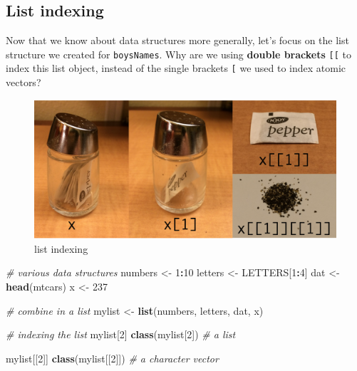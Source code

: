 \documentclass[]{book}
\newenvironment{Shaded}{\begin{snugshade}}{\end{snugshade}}
\newcommand{\CommentTok}[1]{\textcolor[rgb]{0.56,0.35,0.01}{\textit{#1}}}
\newcommand{\DecValTok}[1]{\textcolor[rgb]{0.00,0.00,0.81}{#1}}
\newcommand{\KeywordTok}[1]{\textcolor[rgb]{0.13,0.29,0.53}{\textbf{#1}}}
\newcommand{\NormalTok}[1]{#1}
\newcommand{\OperatorTok}[1]{\textcolor[rgb]{0.81,0.36,0.00}{\textbf{#1}}}
\newcommand{\StringTok}[1]{\textcolor[rgb]{0.31,0.60,0.02}{#1}}
\begin{document}
\hypertarget{list-indexing}{%
\subsection{List indexing}\label{list-indexing}}

Now that we know about data structures more generally, let's focus on the list structure we created for \texttt{boysNames}.
Why are we using \textbf{double brackets} \texttt{{[}{[}} to index this list object, instead of the single brackets \texttt{{[}} we used to index atomic vectors?

\begin{figure}
\centering
\includegraphics{R/RDataWrangling/images/indexing_lists.png}
\caption{list indexing}
\end{figure}

\begin{Shaded}
\begin{Highlighting}[]
\CommentTok{# various data structures}
\NormalTok{numbers <-}\StringTok{ }\DecValTok{1}\OperatorTok{:}\DecValTok{10}
\NormalTok{letters <-}\StringTok{ }\NormalTok{LETTERS[}\DecValTok{1}\OperatorTok{:}\DecValTok{4}\NormalTok{]}
\NormalTok{dat <-}\StringTok{ }\KeywordTok{head}\NormalTok{(mtcars)}
\NormalTok{x <-}\StringTok{ }\DecValTok{237}

\CommentTok{# combine in a list}
\NormalTok{mylist <-}\StringTok{ }\KeywordTok{list}\NormalTok{(numbers, letters, dat, x)}

\CommentTok{# indexing the list}
\NormalTok{mylist[}\DecValTok{2}\NormalTok{]}
\KeywordTok{class}\NormalTok{(mylist[}\DecValTok{2}\NormalTok{]) }\CommentTok{# a list}

\NormalTok{mylist[[}\DecValTok{2}\NormalTok{]]}
\KeywordTok{class}\NormalTok{(mylist[[}\DecValTok{2}\NormalTok{]]) }\CommentTok{# a character vector}
\end{Highlighting}
\end{Shaded}
\end{document}
